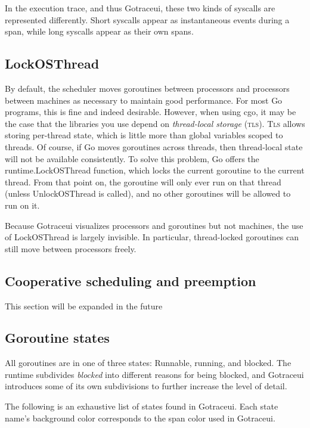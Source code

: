 \documentclass[10pt,letterpaper,oneside,openany,english]{memoir}
\newcommand{\code}[1]{{\ttfamily\mbox{#1}}}
\newcommand{\todo}[1]{{\color{red}#1}}
\begin{document}
In the execution trace, and thus Gotraceui, these two kinds of syscalls are represented differently.
Short syscalls appear as instantaneous events during a span, while long syscalls appear as their own spans.

\subsection{\code{LockOSThread}}

By default, the scheduler moves goroutines between processors and processors between machines as necessary to maintain good performance.
For most Go programs, this is fine and indeed desirable.
However, when using cgo, it may be the case that the libraries you use depend on \emph{thread-local storage} (\textsc{tls}).
\textsc{Tls} allows storing per-thread state, which is little more than global variables scoped to threads.
Of course, if Go moves goroutines across threads, then thread-local state will not be available consistently.
To solve this problem, Go offers the \code{runtime.LockOSThread} function, which locks the current goroutine to the current thread.
From that point on, the goroutine will only ever run on that thread (unless \code{UnlockOSThread} is called), and no other goroutines will be allowed to run on it.

Because Gotraceui visualizes processors and goroutines but not machines, the use of \code{LockOSThread} is largely invisible.
In particular, thread-locked goroutines can still move between processors freely.

\subsection{Cooperative scheduling and preemption}

\todo{This section will be expanded in the future}

\subsection{Goroutine states}\label{goroutine-states}

All goroutines are in one of three states: Runnable, running, and blocked.
The runtime subdivides \emph{blocked} into different reasons for being blocked, and Gotraceui introduces some of its own subdivisions to further increase the level of detail.

The following is an exhaustive list of states found in Gotraceui.
Each state name's background color corresponds to the span color used in Gotraceui.
\end{document}
